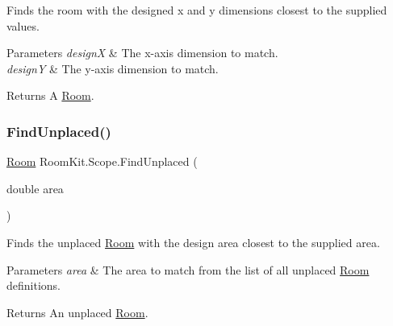 Finds the room with the designed x and y dimensions closest to the supplied values. 


\begin{DoxyParams}{Parameters}
{\em designX} & The x-\/axis dimension to match.\\
\hline
{\em designY} & The y-\/axis dimension to match.\\
\hline
\end{DoxyParams}
\begin{DoxyReturn}{Returns}
A \mbox{\hyperlink{class_room_kit_1_1_room}{Room}}. 
\end{DoxyReturn}
\mbox{\label{class_room_kit_1_1_scope_a9b2db21ca0a8c36a085e3ce37d3655dc}} 
\subsubsection{\texorpdfstring{Find\+Unplaced()}{FindUnplaced()}\hspace{0.1cm}{\footnotesize\ttfamily [1/3]}}
{\footnotesize\ttfamily \mbox{\hyperlink{class_room_kit_1_1_room}{Room}} Room\+Kit.\+Scope.\+Find\+Unplaced (\begin{DoxyParamCaption}\item[{double}]{area }\end{DoxyParamCaption})}



Finds the unplaced \mbox{\hyperlink{class_room_kit_1_1_room}{Room}} with the design area closest to the supplied area. 


\begin{DoxyParams}{Parameters}
{\em area} & The area to match from the list of all unplaced \mbox{\hyperlink{class_room_kit_1_1_room}{Room}} definitions.\\
\hline
\end{DoxyParams}
\begin{DoxyReturn}{Returns}
An unplaced \mbox{\hyperlink{class_room_kit_1_1_room}{Room}}. 
\end{DoxyReturn}
\mbox{\label{class_room_kit_1_1_scope_a8e29aceacafb32cc1f260e5906c75d71}} 
